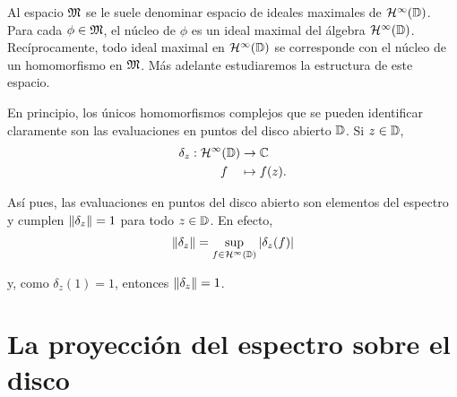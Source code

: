 Al espacio $\mathfrak{M}$ se le suele denominar espacio de ideales maximales de $\mathcal{H}^{\infty}(\mathbb{D})$. Para cada $\phi \in \mathfrak{M}$, el núcleo de $\phi$ es un ideal maximal del álgebra $\mathcal{H}^{\infty}(\mathbb{D})$. Recíprocamente, todo ideal maximal en $\mathcal{H}^{\infty}(\mathbb{D})$ se corresponde con el núcleo de un homomorfismo en $\mathfrak{M}$. Más adelante estudiaremos la estructura de este espacio. \\

\begin{comment}
Existe una correspondencia uno a uno entre los homomorfismos $\phi: \bholomorphic{\disk} \to \complex$ y los ideales maximales $M$ en el álgebra $\bholomorphic{\disk}$. Esta correspondencia está definida por $M = \ker (\phi)$. Cada ideal maximal $M$ es cerrado, así que cada homomorfismo $\phi$ es continuo:
\begin{equation*}
    \abs{\phi (x)} \leq \norm{x}.
\end{equation*}
\end{comment}


En principio, los únicos homomorfismos complejos que se pueden identificar claramente son las evaluaciones en puntos del disco abierto $\mathbb{D}$. Si $z \in \mathbb{D}$,
\begin{equation*}
    \begin{split}
        \delta_z: \mathcal{H}^{\infty}(\mathbb{D}) & \to  \mathbb{C} \\
                   f \, \, \, \, \, \, & \mapsto  f (z).
    \end{split}
\end{equation*}

Así pues, las evaluaciones en puntos del disco abierto son elementos del espectro y cumplen $\left\lVert\delta_z\right\rVert = 1$ para todo $z \in \mathbb{D}$. En efecto,
\begin{equation*}
    \left\lVert\delta_z\right\rVert = \sup_{f \in \mathcal{H}^{\infty}(\mathbb{D})} \left\lvert\delta_z(f)\right\rvert
\end{equation*}

y, como $\delta_z(1) = 1$, entonces $\left\lVert\delta_z\right\rVert=1$. \\

\section{La proyección del espectro sobre el disco}

